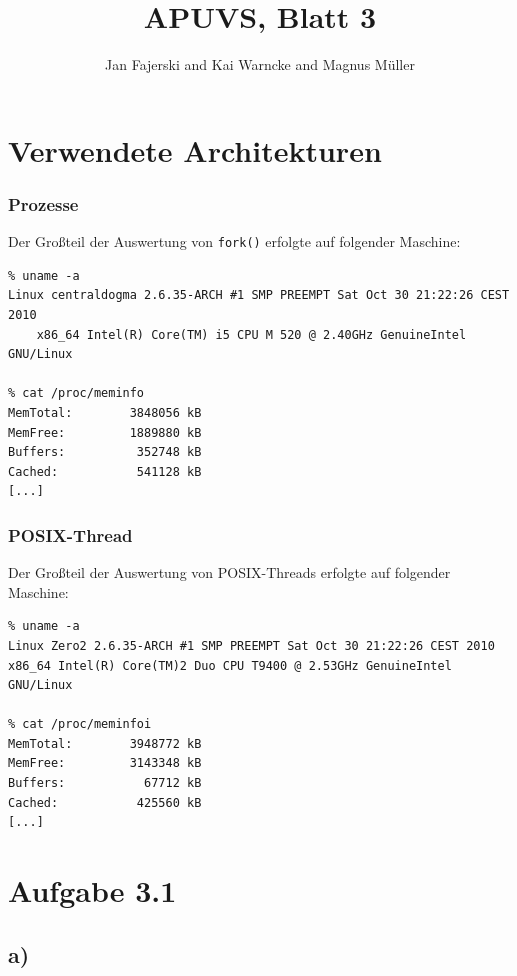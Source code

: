 \documentclass[a4paper,
12pt,
BCOR12mm,
]{scrartcl}
\title{APUVS, Blatt 3}
\author{Jan Fajerski and Kai Warncke and Magnus Müller}
\begin{document}

\maketitle  

\section{Verwendete Architekturen}
\subsubsection{Prozesse}
Der Großteil der Auswertung von \verb|fork()| erfolgte auf folgender Maschine:
\begin{verbatim}
% uname -a
Linux centraldogma 2.6.35-ARCH #1 SMP PREEMPT Sat Oct 30 21:22:26 CEST 2010
	x86_64 Intel(R) Core(TM) i5 CPU M 520 @ 2.40GHz GenuineIntel GNU/Linux

% cat /proc/meminfo
MemTotal:        3848056 kB
MemFree:         1889880 kB
Buffers:          352748 kB
Cached:           541128 kB
[...]
\end{verbatim}
\subsubsection{POSIX-Thread}
Der Großteil der Auswertung von POSIX-Threads erfolgte auf folgender Maschine:
\begin{verbatim}
% uname -a
Linux Zero2 2.6.35-ARCH #1 SMP PREEMPT Sat Oct 30 21:22:26 CEST 2010 
x86_64 Intel(R) Core(TM)2 Duo CPU T9400 @ 2.53GHz GenuineIntel GNU/Linux

% cat /proc/meminfoi
MemTotal:        3948772 kB
MemFree:         3143348 kB
Buffers:           67712 kB
Cached:           425560 kB
[...]
\end{verbatim}


\section{Aufgabe 3.1}
\subsection{a)}
\end{document}
